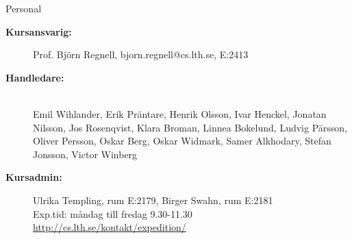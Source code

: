 \ifkompendium\else
\begin{Slide}{Personal}\SlideFontSmall
\begin{description}
\item [\bfseries Kursansvarig:] Prof. Björn Regnell, bjorn.regnell@cs.lth.se, E:2413
\item [\bfseries Handledare:]\\
Emil Wihlander,
Erik Präntare,
Henrik Olsson,
Ivar Henckel,
Jonatan Nilsson,
Jos Rosenqvist,
Klara Broman,
Linnea Bokelund,
Ludvig Pärsson,
Oliver Persson,
Oskar Berg,
Oskar Widmark,
Samer Alkhodary,
Stefan Jonsson,
Victor Winberg
\item [\bfseries Kursadmin:]
Ulrika Templing, rum E:2179, Birger Swahn, rum E:2181 \\
Exp.tid: måndag till fredag 9.30-11.30  \\
\url{http://cs.lth.se/kontakt/expedition/} \\
\end{description}
\end{Slide}
\fi


